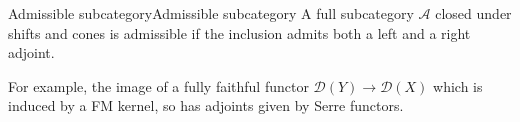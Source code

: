 



\begin{definition}{Admissible subcategory}{Admissible subcategory}
    A full subcategory $\mathcal{A}$ closed under shifts and cones is admissible if the inclusion admits both a left and a right adjoint.
\end{definition}

For example, the image of a fully faithful functor $\mathcal{D}(Y)\xrightarrow{}\mathcal{D}(X)$ which is induced by a FM kernel, so has adjoints given by Serre functors.

